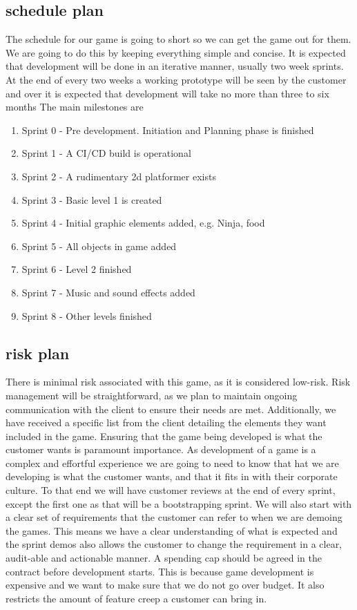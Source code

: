 \documentclass{article}
\begin{document}
\subsection{schedule plan}
The schedule for our game is going to short so we can get the game out for them. We are going to do this by keeping everything simple and concise.
It is expected that development will be done in an iterative manner, usually two week sprints. At the end of every two weeks a working prototype will be seen by the customer and over it is expected that development will take no more than three to six months
The main milestones are
\begin{enumerate}
    \item Sprint 0 - Pre development. Initiation and Planning phase is finished
    \item Sprint 1 - A CI/CD build is operational
    \item Sprint 2 - A rudimentary 2d platformer exists
    \item Sprint 3 - Basic level 1 is created
    \item Sprint 4 - Initial graphic elements added, e.g. Ninja, food
    \item Sprint 5 - All objects in game added
    \item Sprint 6 - Level 2 finished
    \item Sprint 7 - Music and sound effects added 
    \item Sprint 8 - Other levels finished
\end{enumerate}


\subsection{risk plan}
There is minimal risk associated with this game, as it is considered low-risk. Risk management will be straightforward, as we plan to maintain ongoing communication with the client to ensure their needs are met. Additionally, we have received a specific list from the client detailing the elements they want included in the game.
Ensuring that the game being developed is what the customer wants is paramount importance. As development of a game is a complex and effortful experience we are going to need to know that hat we are developing is what the customer wants, and that it fits in with their corporate culture. To that end we will have customer reviews at the end of every sprint, except the first one as that will be a bootstrapping sprint. 
We will also start with a clear set of requirements that the  customer can refer to when we are demoing the games. This means we have a clear understanding of what is expected and the sprint demos also allows the customer to change the requirement in a clear, audit-able and actionable manner.
A spending cap should be agreed in the contract before development starts. This is because game development is expensive and we want to make sure that we do not go over budget. It also restricts the amount of feature creep a customer can bring in.
\end{document}
